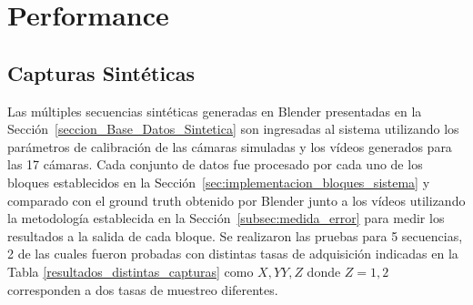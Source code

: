 \section{Performance}\label{seccion_performance}

\subsection{Capturas Sintéticas}

Las múltiples secuencias sintéticas generadas en Blender presentadas en la Sección~\ref{seccion_Base_Datos_Sintetica} son ingresadas al sistema utilizando los parámetros de calibración de las cámaras simuladas y los vídeos generados para las 17 cámaras. Cada conjunto de datos fue procesado por cada uno de los bloques establecidos en la Sección~\ref{sec:implementacion_bloques_sistema} y comparado con el ground truth obtenido por Blender junto a los vídeos utilizando la metodología establecida en la Sección~\ref{subsec:medida_error} para medir los resultados a la salida de cada bloque. Se realizaron las pruebas para 5 secuencias, 2 de las cuales fueron probadas con distintas tasas de adquisición indicadas en la Tabla \ref{resultados_distintas_capturas} como $X,YY,Z$ donde $Z=1,2$ corresponden a dos tasas de muestreo diferentes.

